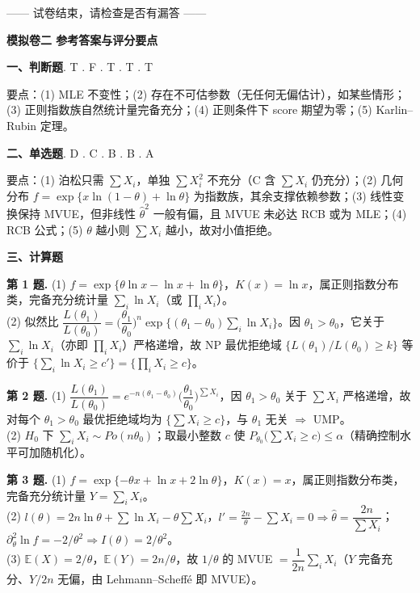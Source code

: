 \documentclass[12pt,a4paper]{ctexart}
\newcommand{\E}{\mathbb{E}}
\begin{document}
\vfill
\begin{center}\small —— 试卷结束，请检查是否有漏答 ——\end{center}

\newpage
\begin{center}{\Large\bfseries 模拟卷二 \quad 参考答案与评分要点}\end{center}

\noindent\textbf{一、判断题}. T . F . T . T . T\par
\smallskip
\noindent 要点：(1) MLE 不变性；(2) 存在不可估参数（无任何无偏估计），如某些情形；(3) 正则指数族自然统计量完备充分；(4) 正则条件下 score 期望为零；(5) Karlin--Rubin 定理。

\medskip
\noindent\textbf{二、单选题}. D . C . B . B . A\par
\smallskip
\noindent 要点：(1) 泊松只需 $\sum X_i$，单独 $\sum X_i^2$ 不充分（C 含 $\sum X_i$ 仍充分）；(2) 几何分布 $f=\exp\{x\ln(1-\theta)+\ln\theta\}$ 为指数族，其余支撑依赖参数；(3) 线性变换保持 MVUE，但非线性 $\hat\theta^2$ 一般有偏，且 MVUE 未必达 RCB 或为 MLE；(4) RCB 公式；(5) $\theta$ 越小则 $\sum X_i$ 越小，故对小值拒绝。

\medskip
\noindent\textbf{三、计算题}

\smallskip
\noindent\textbf{第 1 题.}\;
(1) $f=\exp\{\theta\ln x-\ln x+\ln\theta\}$，$K(x)=\ln x$，属正则指数分布类，完备充分统计量 $\sum_i\ln X_i$（或 $\prod_i X_i$）。\\
(2) 似然比 $\dfrac{L(\theta_1)}{L(\theta_0)}=\Big(\dfrac{\theta_1}{\theta_0}\Big)^n\exp\Big\{(\theta_1-\theta_0)\sum_i\ln X_i\Big\}$。因 $\theta_1>\theta_0$，它关于 $\sum_i\ln X_i$（亦即 $\prod_i X_i$）严格递增，故 NP 最优拒绝域 $\{L(\theta_1)/L(\theta_0)\ge k\}$ 等价于 $\{\sum_i\ln X_i\ge c'\}=\{\prod_i X_i\ge c\}$。

\smallskip
\noindent\textbf{第 2 题.}\;
(1) $\dfrac{L(\theta_1)}{L(\theta_0)}=e^{-n(\theta_1-\theta_0)}\Big(\dfrac{\theta_1}{\theta_0}\Big)^{\sum X_i}$，因 $\theta_1>\theta_0$ 关于 $\sum X_i$ 严格递增，故对每个 $\theta_1>\theta_0$ 最优拒绝域均为 $\{\sum X_i\ge c\}$，与 $\theta_1$ 无关 $\Rightarrow$ UMP。\\
(2) $H_0$ 下 $\sum_i X_i\sim Po(n\theta_0)$；取最小整数 $c$ 使 $P_{\theta_0}\big(\sum X_i\ge c\big)\le\alpha$（精确控制水平可加随机化）。

\smallskip
\noindent\textbf{第 3 题.}\;
(1) $f=\exp\{-\theta x+\ln x+2\ln\theta\}$，$K(x)=x$，属正则指数分布类，完备充分统计量 $Y=\sum_i X_i$。\\
(2) $l(\theta)=2n\ln\theta+\sum\ln X_i-\theta\sum X_i$，$l'=\tfrac{2n}\theta-\sum X_i=0\Rightarrow\hat\theta=\dfrac{2n}{\sum X_i}$；$\partial^2_\theta\ln f=-2/\theta^2\Rightarrow I(\theta)=2/\theta^2$。\\
(3) $\E(X)=2/\theta$，$\E(Y)=2n/\theta$，故 $1/\theta$ 的 MVUE $=\boxed{\dfrac{1}{2n}\sum_i X_i}$（$Y$ 完备充分、$Y/2n$ 无偏，由 Lehmann--Scheffé 即 MVUE）。
\end{document}

